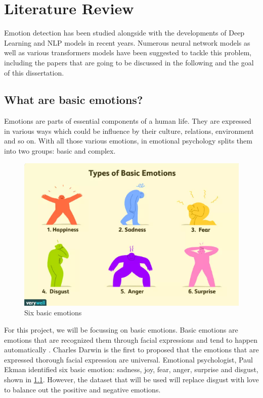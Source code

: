 
\chapter{Literature Review}

Emotion detection has been studied alongside with the developments of Deep Learning and NLP models in recent years. 
Numerous neural network models as well as various transformers models have been suggested to tackle this problem, including the papers that are going to be discussed in the following and the goal of this dissertation.

\section{What are basic emotions?}
Emotions are parts of essential components of a human life. They are expressed in various ways which could be influence by their culture, relations, environment and so on. With all those various emotions, in emotional psychology splits them into two groups: basic and complex.

\begin{figure}[ht]
    \centerline{\includegraphics[scale=0.75]{Figures/six_emotions.png}}
    \caption{Six basic emotions}
    \label{fig:emotions}
 \end{figure}

For this project, we will be focussing on basic emotions. Basic emotions are emotions that are recognized them through facial expressions and tend to happen automatically \cite{Uwa_2023}. Charles Darwin is the first to proposed that the emotions that are expressed thorough facial expression are universal. Emotional psychologist, Paul Ekman identified six basic emotion: sadness, joy, fear, anger, surprise and disgust, shown in \ref{fig:emotions}. However, the dataset that will be used will replace disgust with love to balance out the positive and negative emotions.

